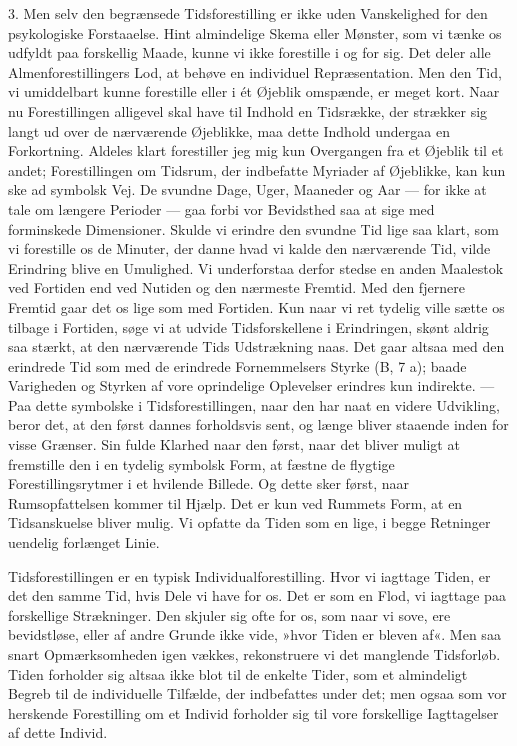 \documentclass[12pt,a4paper,openany]{book}
\newcommand{\opage}[1]{\marginnote{\footnotesize\textit{[#1]}}}
\begin{document}
3. Men selv den begrænsede Tidsforestilling er ikke uden Vanskelighed
for den psykologiske Forstaaelse. Hint almindelige Skema eller Mønster,
som vi tænke os udfyldt paa forskellig Maade, kunne vi ikke forestille i
og for sig. Det deler alle Almenforestillingers Lod, at behøve en
individuel Repræsentation. Men den Tid, vi umiddelbart kunne forestille
eller i ét Øjeblik omspænde, er meget kort. Naar nu Forestillingen
alligevel skal have til Indhold en Tidsrække, der strækker sig langt ud
over de nærværende Øjeblikke, maa dette Indhold undergaa en Forkortning.
Aldeles klart forestiller jeg mig kun Overgangen fra et Øjeblik til et
andet; Forestillingen om Tidsrum, der indbefatte Myriader af Øjeblikke,
kan kun ske ad symbolsk Vej. De svundne Dage, Uger, Maaneder og Aar ---
for ikke at tale om længere Perioder --- gaa forbi vor Bevidsthed saa at
sige med forminskede Dimensioner. Skulde vi erindre den svundne Tid lige
saa klart, som vi forestille os de Minuter, der danne hvad vi kalde den
nærværende Tid, vilde Erindring blive en Umulighed. Vi underforstaa
derfor stedse en anden Maalestok ved Fortiden end ved Nutiden og den
nærmeste Fremtid. Med den fjernere Fremtid gaar det os lige som med
Fortiden. Kun naar vi ret tydelig ville sætte os tilbage i Fortiden,
søge vi at udvide Tidsforskellene i Erindringen, skønt aldrig saa
stærkt, at den nærværende Tids Udstrækning naas. Det gaar altsaa med den
erindrede Tid som med de erindrede Fornemmelsers Styrke (B, 7 a); baade
Varigheden og Styrken af vore oprindelige Oplevelser erindres kun
indirekte. --- Paa dette symbolske i Tidsforestillingen, naar den har
naat
\opage{231}en videre Udvikling, beror det, at den først dannes
forholdsvis sent, og længe bliver staaende inden for visse Grænser. Sin
fulde Klarhed naar den først, naar det bliver muligt at fremstille den i
en tydelig symbolsk Form, at fæstne de flygtige Forestillingsrytmer i et
hvilende Billede. Og dette sker først, naar Rumsopfattelsen kommer til
Hjælp. Det er kun ved Rummets Form, at en Tidsanskuelse bliver mulig. Vi
opfatte da Tiden som en lige, i begge Retninger uendelig forlænget
Linie.

Tidsforestillingen er en typisk Individualforestilling. Hvor vi iagttage
Tiden, er det den samme Tid, hvis Dele vi have for os. Det er som en
Flod, vi iagttage paa forskellige Strækninger. Den skjuler sig ofte for
os, som naar vi sove, ere bevidstløse, eller af andre Grunde ikke vide,
»hvor Tiden er bleven af«. Men saa snart Opmærksomheden igen vækkes,
rekonstruere vi det manglende Tidsforløb. Tiden forholder sig altsaa
ikke blot til de enkelte Tider, som et almindeligt Begreb til de
individuelle Tilfælde, der indbefattes under det; men ogsaa som vor
herskende Forestilling om et Individ forholder sig til vore forskellige
Iagttagelser af dette Individ.
\end{document}
